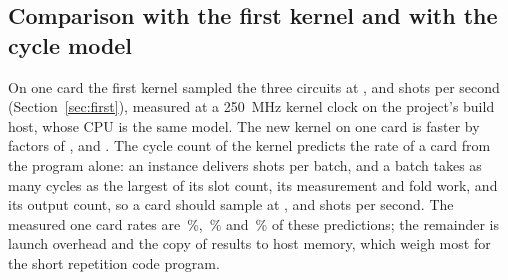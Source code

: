 \subsection{Comparison with the first kernel and with the cycle model}\label{sec:res-first}

On one card the first kernel sampled the three circuits at \NumFirstKernelRep{}, \NumFirstKernelSurfThree{} and
\NumFirstKernelSurfFive{} shots per second (Section~\ref{sec:first}), measured at a 250~MHz kernel clock on the
project's build host, whose CPU is the same model. The new kernel on one card is faster by factors of
\NumOverFirstRep{}, \NumOverFirstSurfThree{} and \NumOverFirstSurfFive{}. The cycle count of the kernel predicts the
rate of a card from the program alone: an instance delivers \NumLanes{} shots per batch, and a batch takes as many
cycles as the largest of its slot count, its measurement and fold work, and its output count, so a card should
sample at \NumModelCardRep{}, \NumModelCardSurfThree{} and \NumModelCardSurfFive{} shots per second. The measured one
card rates are \NumModelFracRep\,\%, \NumModelFracSurfThree\,\% and \NumModelFracSurfFive\,\% of these predictions; the
remainder is launch overhead and the copy of results to host memory, which weigh most for the short repetition code
program.
